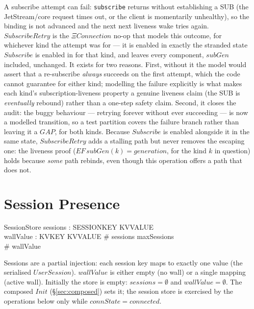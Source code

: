 \documentclass[a4paper,10pt,fleqn]{article}
\begin{document}
A subscribe attempt can fail: \texttt{subscribe} returns without
establishing a SUB (the JetStream/core request times out, or the client
is momentarily unhealthy), so the binding is not advanced and the next
next liveness wake tries again.  $SubscribeRetry$ is the $\Xi Connection$ no-op that
models this outcome, for whichever kind the attempt was for --- it is
enabled in exactly the stranded state $Subscribe$ is enabled in for that
kind, and leaves every component, $subGen$ included, unchanged.  It
exists for two reasons.  First, without it the model would assert that a
re-subscribe \emph{always} succeeds on the first attempt, which the code
cannot guarantee for either kind; modelling the failure explicitly is
what makes each kind's subscription-liveness property a genuine liveness
claim (the SUB is \emph{eventually} rebound) rather than a one-step
safety claim.  Second, it closes the audit: the buggy behaviour ---
retrying forever without ever succeeding --- is now a modelled
transition, so a test partition covers the failure branch rather than
leaving it a $GAP$, for both kinds.  Because $Subscribe$ is enabled
alongside it in the same state, $SubscribeRetry$ adds a stalling path but
never removes the escaping one: the liveness proof ($EF\,subGen(k) =
generation$, for the kind $k$ in question) holds because \emph{some} path
rebinds, even though this operation offers a path that does not.

\section{Session Presence}

\begin{schema}{SessionStore}
  sessions : SESSIONKEY \pinj KVVALUE \\
  wallValue : KVKEY \pfun KVVALUE
  \where
  \# sessions \leq maxSessions \\
  \# wallValue 
\end{schema}

Sessions are a partial injection: each session key maps to
exactly one value (the serialised $UserSession$).  $wallValue$
is either empty (no wall) or a single mapping (active wall).
Initially the store is empty: $sessions = \emptyset$ and
$wallValue = \emptyset$.  The composed $Init$ (\S\ref{sec:composed}) sets it;
the session store is exercised by the operations below only while
$connState = connected$.
\end{document}
